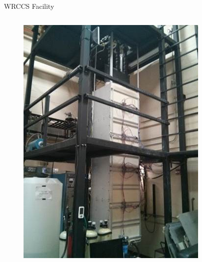 \documentclass[10pt,t,xcolor=table]{UWMadBeamer}
\begin{document}
\begin{frame}{WRCCS Facility}
\begin{columns}
\begin{column}{0.28\paperwidth}
\begin{figure}
                \includegraphics[keepaspectratio,height=0.35\paperheight]{WRCCS_HeaterBox}
            \end{figure}
        \end{column}
    \end{columns}
\end{frame}
\end{document}
